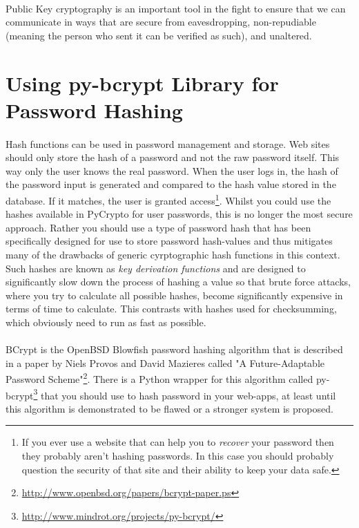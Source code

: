 \documentclass[12pt, a4paper, oneside]{book}
\begin{document}
{\paragraph{} Public Key cryptography is an important tool in the fight to ensure that we can communicate in ways that are secure from eavesdropping, non-repudiable (meaning the person who sent it can be verified as such), and unaltered.

\section{Using py-bcrypt Library for Password Hashing}
\label{py-bcrypt}
\paragraph{} Hash functions can be used in password management and storage. Web sites should only store the hash of a password and not the raw password itself. This way only the user knows the real password. When the user logs in, the hash of the password input is generated and compared to the hash value stored in the database. If it matches, the user is granted access\footnote{If you ever use a website that can help you to \emph{recover} your password then they probably aren't hashing passwords. In this case you should probably question the security of that site and their ability to keep your data safe.}. Whilst you could use the hashes available in PyCrypto for user passwords, this is no longer the most secure approach. Rather you should use a type of password hash that has been specifically designed for use to store password hash-values and thus mitigates many of the drawbacks of generic cyrptographic hash functions in this context. Such hashes are known as \emph{key derivation functions} and are designed to significantly slow down the process of hashing a value so that brute force attacks, where you try to calculate all possible hashes, become significantly expensive in terms of time to calculate. This contrasts with hashes used for checksumming, which obviously need to run as fast as possible. 

\paragraph{} BCrypt is the OpenBSD Blowfish password hashing algorithm that is described in a paper by Niels Provos and David Mazieres called "A Future-Adaptable Password Scheme"\footnote{\url{http://www.openbsd.org/papers/bcrypt-paper.ps}}. There is a Python wrapper for this algorithm called py-bcrypt\footnote{\url{http://www.mindrot.org/projects/py-bcrypt/}} that you should use to hash password in your web-apps, at least until this algorithm is demonstrated to be flawed or a stronger system is proposed.

}
\end{document}
